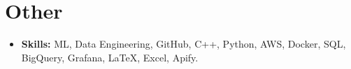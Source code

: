 \documentclass[letterpaper,11pt]{article}
\newcommand{\resumeItem}[1]{
  \item\small{
    {#1 \vspace{-2pt}}
  }
}
\newcommand{\resumeSubHeadingListStart}{\begin{itemize}[leftmargin=0.15in, label={}]}
\newcommand{\resumeSubHeadingListEnd}{\end{itemize}}
\begin{document}
\section{Other}
\resumeSubHeadingListStart
  \resumeItem{\textbf{Skills:} ML, Data Engineering, GitHub, C++, Python, AWS, Docker, SQL, BigQuery, Grafana, LaTeX, Excel, Apify.}
\resumeSubHeadingListEnd
\end{document}
